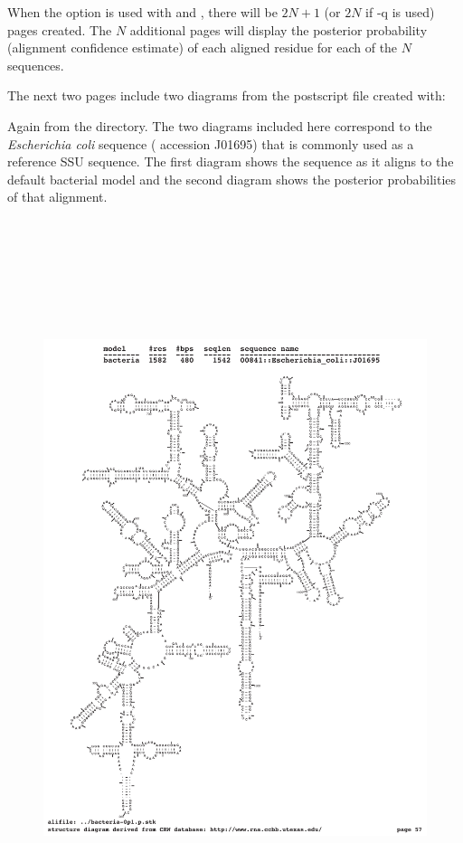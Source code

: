 When the  option is used with  and
, there will be $2N+1$ (or $2N$ if {\prog -q} is used)
pages created. The $N$ additional pages will display the posterior
probability (alignment confidence estimate) of each aligned residue
for each of the $N$ sequences.

The next two pages include two diagrams from the postscript file 
 created with:


Again from the  directory.
The two diagrams included here correspond to the
\emph{Escherichia coli} sequence ( accession J01695) that
is commonly used as a reference SSU sequence. The first diagram shows
the sequence as it aligns to the default bacterial model and the
second diagram shows the posterior probabilities of that alignment.

\newpage

\begin{figure}[h]
\includegraphics[height=8.5in]{Figures/ecoli-seq}
\label{fig:ecoli-seq}
\end{figure}

